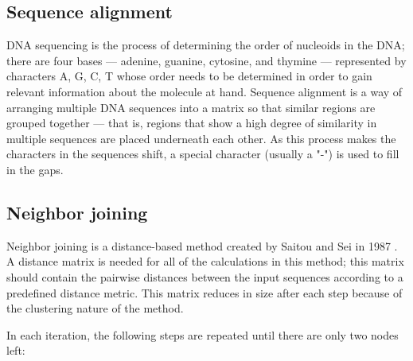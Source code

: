\documentclass[11pt,twocolumn]{article}
\begin{document}
\subsection*{Sequence alignment}

DNA sequencing is the process of determining the order of nucleoids in the DNA; there are four bases — adenine, guanine, cytosine, and thymine — represented by characters A, G, C, T whose order needs to be determined in order to gain relevant information about the molecule at hand. Sequence alignment is a way of arranging multiple DNA sequences into a matrix so that similar regions are grouped together — that is, regions that show a high degree of similarity in multiple sequences are placed underneath each other. As this process makes the characters in the sequences shift, a special character (usually a "-") is used to fill in the gaps.

\subsection*{Neighbor joining}

Neighbor joining is a distance-based method created by Saitou and Sei in 1987 \cite{1987}. A distance matrix is needed for all of the calculations in this method; this matrix should contain the pairwise distances between the input sequences according to a predefined distance metric. This matrix reduces in size after each step because of the clustering nature of the method.

In each iteration, the following steps are repeated until there are only two nodes left:
\end{document}

